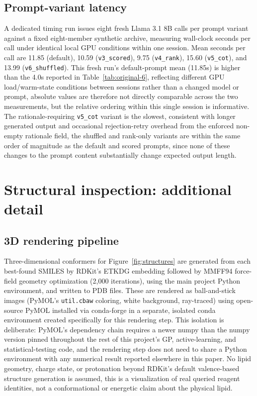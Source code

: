 \subsection{Prompt-variant latency}
\label{app:variant-latency}
A dedicated timing run issues eight fresh Llama 3.1 8B calls per prompt variant against a fixed eight-member synthetic archive, measuring wall-clock seconds per call under identical local GPU conditions within one session. Mean seconds per call are 11.85 (default), 10.59 (\texttt{v3\_scored}), 9.75 (\texttt{v4\_rank}), 15.60 (\texttt{v5\_cot}), and 13.99 (\texttt{v6\_shuffled}). This fresh run's default-prompt mean (11.85s) is higher than the 4.0s reported in Table~\ref{tab:original-6}, reflecting different GPU load/warm-state conditions between sessions rather than a changed model or prompt, absolute values are therefore not directly comparable across the two measurements, but the relative ordering within this single session is informative. The rationale-requiring \texttt{v5\_cot} variant is the slowest, consistent with longer generated output and occasional rejection-retry overhead from the enforced non-empty rationale field, the shuffled and rank-only variants are within the same order of magnitude as the default and scored prompts, since none of these changes to the prompt content substantially change expected output length.

\section{Structural inspection: additional detail}
\label{app:structures}
\subsection{3D rendering pipeline}
Three-dimensional conformers for Figure~\ref{fig:structures} are generated from each best-found SMILES by RDKit's ETKDG embedding followed by MMFF94 force-field geometry optimization (2,000 iterations), using the main project Python environment, and written to PDB files. These are rendered as ball-and-stick images (PyMOL's \texttt{util.cbaw} coloring, white background, ray-traced) using open-source PyMOL installed via conda-forge in a separate, isolated conda environment created specifically for this rendering step. This isolation is deliberate: PyMOL's dependency chain requires a newer numpy than the numpy version pinned throughout the rest of this project's GP, active-learning, and statistical-testing code, and the rendering step does not need to share a Python environment with any numerical result reported elsewhere in this paper. No lipid geometry, charge state, or protonation beyond RDKit's default valence-based structure generation is assumed, this is a visualization of real queried reagent identities, not a conformational or energetic claim about the physical lipid.

